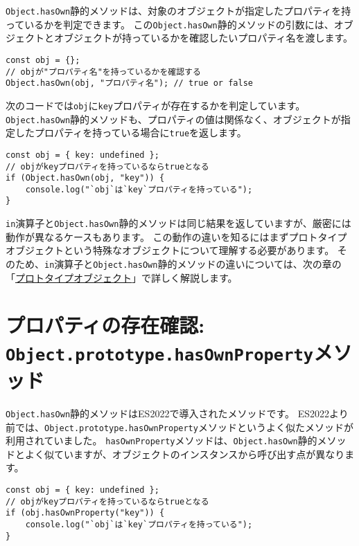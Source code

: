 \texttt{Object.hasOwn}静的メソッドは、対象のオブジェクトが指定したプロパティを持っているかを判定できます。
この\texttt{Object.hasOwn}静的メソッドの引数には、オブジェクトとオブジェクトが持っているかを確認したいプロパティ名を渡します。

\begin{lstlisting}
const obj = {};
// objが"プロパティ名"を持っているかを確認する
Object.hasOwn(obj, "プロパティ名"); // true or false
\end{lstlisting}

次のコードでは\texttt{obj}に\texttt{key}プロパティが存在するかを判定しています。
\texttt{Object.hasOwn}静的メソッドも、プロパティの値は関係なく、オブジェクトが指定したプロパティを持っている場合に\texttt{true}を返します。

\begin{lstlisting}
const obj = { key: undefined };
// objがkeyプロパティを持っているならtrueとなる
if (Object.hasOwn(obj, "key")) {
    console.log("`obj`は`key`プロパティを持っている");
}
\end{lstlisting}

\texttt{in}演算子と\texttt{Object.hasOwn}静的メソッドは同じ結果を返していますが、厳密には動作が異なるケースもあります。
この動作の違いを知るにはまずプロトタイプオブジェクトという特殊なオブジェクトについて理解する必要があります。
そのため、\texttt{in}演算子と\texttt{Object.hasOwn}静的メソッドの違いについては、次の章の「\hyperlink{prototype-object}{プロトタイプオブジェクト}」で詳しく解説します。

\hypertarget{hasOwnProperty-method}{%
\section{プロパティの存在確認: \texttt{Object.prototype.hasOwnProperty}メソッド}\label{hasOwnProperty-method}}

\texttt{Object.hasOwn}静的メソッドはES2022で導入されたメソッドです。
ES2022より前では、\texttt{Object.prototype.hasOwnProperty}メソッドというよく似たメソッドが利用されていました。
\texttt{hasOwnProperty}メソッドは、\texttt{Object.hasOwn}静的メソッドとよく似ていますが、オブジェクトのインスタンスから呼び出す点が異なります。

\begin{lstlisting}
const obj = { key: undefined };
// objがkeyプロパティを持っているならtrueとなる
if (obj.hasOwnProperty("key")) {
    console.log("`obj`は`key`プロパティを持っている");
}
\end{lstlisting}


